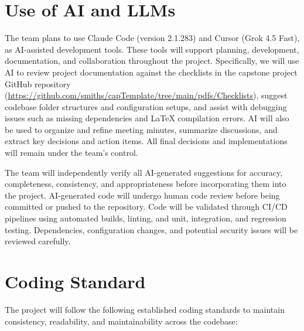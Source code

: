 \documentclass{article}
\begin{document}
\section{Use of AI and LLMs}

The team plans to use Claude Code (version 2.1.283) and Cursor (Grok 4.5 Fast), as AI-assisted development tools.
These tools will support planning, development, documentation, and
collaboration throughout the project.  Specifically, we will use AI to review
project documentation against the checklists in the capstone project GitHub
repository (\url{https://github.com/smiths/capTemplate/tree/main/pdfs/Checklists}),
suggest codebase folder structures and configuration setups, and assist with
debugging issues such as missing dependencies and LaTeX compilation errors.  AI will
also be used to organize and refine meeting minutes, summarize discussions,
and extract key decisions and action items.  All final decisions and
implementations will remain under the team's control.

\bigskip
The team will independently verify all AI-generated suggestions for accuracy,
completeness, consistency, and appropriateness before incorporating them into
the project. AI-generated code will undergo human code review before being 
committed or pushed to the repository.  Code
will be validated through CI/CD pipelines using automated builds, linting, and
unit, integration, and regression testing.  Dependencies, configuration
changes, and potential security issues will be reviewed carefully.

\section{Coding Standard} \label{sec_CodingStandard}

The project will follow the following established coding standards to maintain consistency, readability, and maintainability across the codebase:
\end{document}
